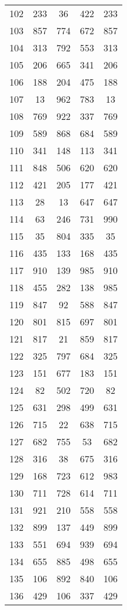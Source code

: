 \documentclass[a4paper,10pt,ngerman]{scrartcl}
\begin{document}
\begin{longtable}[c]{c|c|c|c|c}
    102 & 233 & 36 & 422 & 233 \\
    103 & 857 & 774 & 672 & 857 \\
    104 & 313 & 792 & 553 & 313 \\
    105 & 206 & 665 & 341 & 206 \\
    106 & 188 & 204 & 475 & 188 \\
    107 & 13 & 962 & 783 & 13 \\
    108 & 769 & 922 & 337 & 769 \\
    109 & 589 & 868 & 684 & 589 \\
    110 & 341 & 148 & 113 & 341 \\
    111 & 848 & 506 & 620 & 620 \\
    112 & 421 & 205 & 177 & 421 \\
    113 & 28 & 13 & 647 & 647 \\
    114 & 63 & 246 & 731 & 990 \\
    115 & 35 & 804 & 335 & 35 \\
    116 & 435 & 133 & 168 & 435 \\
    117 & 910 & 139 & 985 & 910 \\
    118 & 455 & 282 & 138 & 985 \\
    119 & 847 & 92 & 588 & 847 \\
    120 & 801 & 815 & 697 & 801 \\
    121 & 817 & 21 & 859 & 817 \\
    122 & 325 & 797 & 684 & 325 \\
    123 & 151 & 677 & 183 & 151 \\
    124 & 82 & 502 & 720 & 82 \\
    125 & 631 & 298 & 499 & 631 \\
    126 & 715 & 22 & 638 & 715 \\
    127 & 682 & 755 & 53 & 682 \\
    128 & 316 & 38 & 675 & 316 \\
    129 & 168 & 723 & 612 & 983 \\
    130 & 711 & 728 & 614 & 711 \\
    131 & 921 & 210 & 558 & 558 \\
    132 & 899 & 137 & 449 & 899 \\
    133 & 551 & 694 & 939 & 694 \\
    134 & 655 & 885 & 498 & 655 \\
    135 & 106 & 892 & 840 & 106 \\
    136 & 429 & 106 & 337 & 429 \\

\end{longtable}
\end{document}
